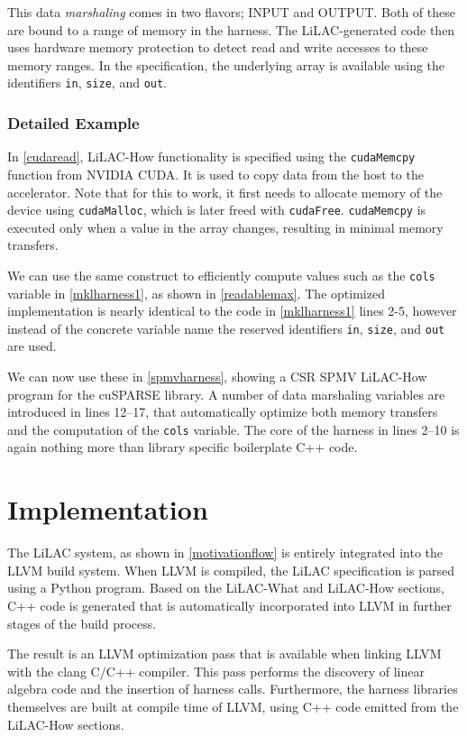 This data {\em marshaling} comes in two flavors; INPUT and OUTPUT.
Both of these are bound to a range of memory in the harness.
The LiLAC-generated code then uses hardware memory protection to detect read and
write accesses to these memory ranges.
In the specification, the underlying array is available using the
identifiers {\tt in}, {\tt size}, and {\tt out}.

\subsubsection{Detailed Example}
In \autoref{cudaread}, LiLAC-How functionality is specified using the
\texttt{cudaMemcpy} function from NVIDIA CUDA.
It is used to copy data from the host to the accelerator.
Note that for this to work, it first needs to allocate memory of the
device using \texttt{cudaMalloc}, which is later freed with \texttt{cudaFree}.
\texttt{cudaMemcpy} is executed only when a value in the array changes,
resulting in minimal memory transfers.

We can use the same construct to efficiently compute values
such as the \texttt{cols} variable in \autoref{mklharness1}, as shown in
\autoref{readablemax}.
The optimized implementation is nearly identical to the code in
\autoref{mklharness1} lines 2-5, however instead of the concrete variable name
the reserved identifiers {\tt in}, {\tt size}, and {\tt out} are used.
\pagebreak

We can now use these in \autoref{spmvharness}, showing a CSR SPMV
LiLAC-How program for the cuSPARSE library.
A number of data marshaling variables are introduced in lines 12--17, that
automatically optimize both memory transfers and the computation of the
\texttt{cols} variable.
The core of the harness in lines 2--10 is again nothing more than 
library specific boilerplate C++ code.

\section{Implementation}
\label{sec:implementation}
The LiLAC system, as shown in \autoref{motivationflow} is entirely integrated
into the LLVM build system.
When LLVM is compiled, the LiLAC specification is parsed using a Python
program.
Based on the LiLAC-What and LiLAC-How sections, C++ code is generated that is
automatically incorporated into LLVM in further stages of the build process.

The result is an LLVM optimization pass that is available when linking LLVM
with the clang C/C++ compiler.
This pass performs the discovery of linear algebra code and the insertion of
harness calls.
Furthermore, the harness libraries themselves are built at compile time of LLVM,
using C++ code emitted from the LiLAC-How sections.

